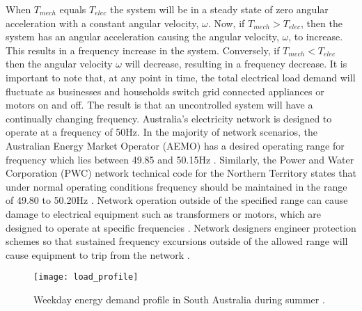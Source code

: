 When $T_{mech}$ equals $T_{elec}$ the system will be in a steady state of zero angular acceleration with a constant angular velocity, $\omega$. Now, if $T_{mech} > T_{elec}$, then the system has an angular acceleration causing the angular velocity, $\omega$, to increase. This results in a frequency increase in the system. Conversely, if $T_{mech} < T_{elec}$ then the angular velocity $\omega$ will decrease, resulting in a frequency decrease. It is important to note that, at any point in time, the total electrical load demand will fluctuate as businesses and households switch grid connected appliances or motors on and off. The result is that an uncontrolled system will have a continually changing frequency. Australia's electricity network is designed to operate at a frequency of 50$\si{\hertz}$. In the majority of network scenarios, the Australian Energy Market Operator (AEMO) has a desired operating range for frequency which lies between 49.85 and 50.15$\si{\hertz}$ \cite{AEMOfreqdev}. Similarly, the Power and Water Corporation (PWC) network technical code for the Northern Territory states that under normal operating conditions frequency should be maintained in the range of 49.80 to 50.20$\si{\hertz}$ \cite{Pwc2013}. Network operation outside of the specified range can cause damage to electrical equipment such as transformers or motors, which are designed to operate at specific frequencies \cite{Sen2014}. Network designers engineer protection schemes so that sustained frequency excursions outside of the allowed range will cause equipment to trip from the network \cite{AEMOpowerfreqriskrev}.

\begin{figure}[ht]
	\centering
	\texttt{[image: load\_profile]}
	\caption{Weekday energy demand profile in South Australia during summer \cite{Aemosaenergyrep}.}
	\label{fig:energydemand}
\end{figure}

\newpage

